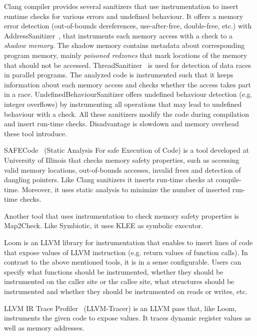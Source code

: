 Clang compiler provides several sanitizers that use instrumentation to insert
runtime checks for various errors and undefined behaviour. It offers a memory
error detection (out-of-bounds dereferences, use-after-free, double-free, etc.)
with AddressSanitizer~\cite{asan}, that instruments each memory access with a
check to a \textit{shadow memory}. The shadow memory contains metadata about
corresponding program memory, mainly \textit{poisoned redzones} that mark
locations of the memory that should not be accessed.
ThreadSanitizer~\cite{tsan} is used for detection of data races in parallel
programs. The analyzed code is instrumented such that it keeps information
about each memory access and checks whether the access takes part in a race.
UndefinedBehaviourSanitizer offers undefined behaviour detection (e.g. integer
overflows) by instrumenting all operations that may lead to undefined behaviour
with a check. All these sanitizers modify the code during compilation and
insert run-time checks. Disadvantage is slowdown and memory overhead these tool
introduce.

SAFECode~\cite{safecode} (Static Analysis For safe Execution of Code) is a tool
developed at University of Illinois that checks memory safety properties, such
as accessing valid memory locations, out-of-bounds accesses, invalid frees and
detection of dangling pointers. Like Clang sanitizers it inserts run-time
checks at compile-time. Moreover, it uses static analysis to minimize the
number of inserted run-time checks.

Another tool that uses instrumentation to check memory safety properties is
Map2Check. Like Symbiotic, it uses KLEE as symbolic executor. 

Loom is an LLVM library for instrumentation that enables to insert lines of
code that expose values of LLVM instruction (e.g. return values of function
calls). In contrast to the above mentioned tools, it is in a sense
configurable. Users can specify what functions should be instrumented, whether
they should be instrumented on the caller site or the callee site, what
structures should be instrumented and whether they should be instrumented on
reads or writes, etc.

LLVM IR Trace Profiler~\cite{tracer} (LLVM-Tracer) is an LLVM pass that, like Loom,
instruments the given code to expose values. It traces dynamic register values
as well as memory addresses.
